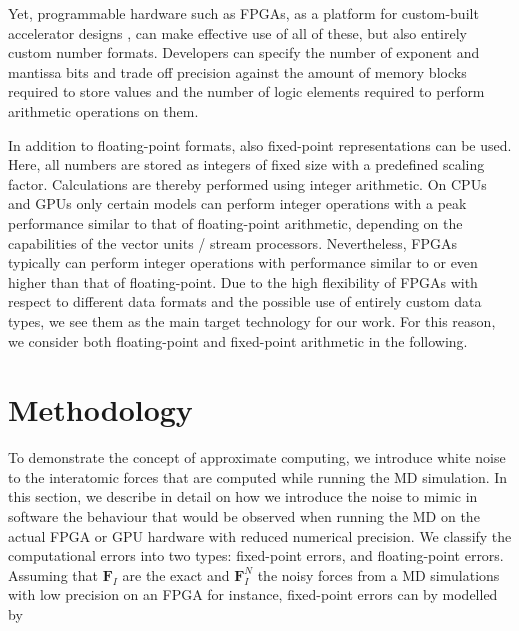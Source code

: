 \documentclass[preprint]{elsarticle}
\begin{document}
Yet, programmable hardware such as FPGAs, as a platform for custom-built accelerator designs \cite{Strzodka2006, KenterVector, KenterPragma}, can make effective use of all of these, but also entirely custom number formats.
Developers can specify the number of exponent and mantissa bits and trade off precision against the amount of memory blocks required to store values and the number of logic elements required to perform arithmetic operations on them.

In addition to floating-point formats, also fixed-point representations can be used. Here, all numbers are stored as integers of fixed size with a
predefined scaling factor. Calculations are thereby performed using integer arithmetic. On CPUs and GPUs only certain models can perform integer operations with a peak performance similar to that of floating-point arithmetic, depending on the capabilities of the vector units / stream processors. Nevertheless, FPGAs typically can perform integer operations with performance similar to or even higher than that of floating-point. Due to the high flexibility of FPGAs with respect to different data formats and the possible use of entirely custom data types, we see them as the main target technology for our work. For this reason, we consider both floating-point and fixed-point arithmetic in the following.

\section{Methodology}
\label{sec:methodology}
To demonstrate the concept of approximate computing, we introduce white noise to the interatomic forces that are computed while running the MD simulation. In this section, we describe in detail on how we introduce the noise to mimic in software the behaviour that would be observed when running the MD on the actual FPGA or GPU hardware with reduced numerical precision. We classify the computational errors into two types: fixed-point errors, and floating-point errors. Assuming that $\textbf{F}_{I}$ are the exact and $\textbf{F}_{I}^{N}$ the noisy forces from a MD simulations with low precision on an FPGA for instance, fixed-point errors can by modelled by
\end{document}
